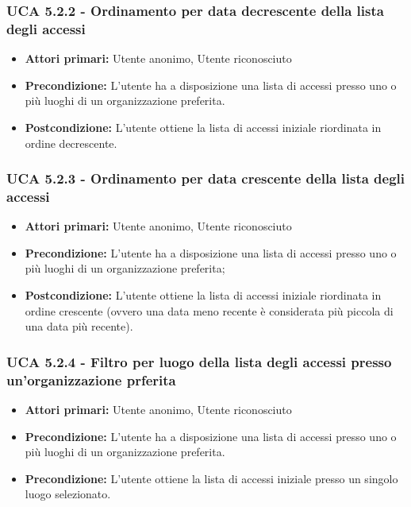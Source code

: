 \subsubsection{UCA 5.2.2 - Ordinamento per data decrescente della lista degli accessi}
\begin{itemize}
    \item \textbf{Attori primari:} Utente anonimo, Utente riconosciuto
    \item \textbf{Precondizione:} L'utente ha a disposizione una lista di accessi presso uno o più luoghi di un organizzazione preferita.
    \item \textbf{Postcondizione:} L'utente ottiene la lista di accessi iniziale riordinata in ordine decrescente.
\end{itemize}

\subsubsection{UCA 5.2.3 - Ordinamento per data crescente della lista degli accessi}
\begin{itemize}
    \item \textbf{Attori primari:} Utente anonimo, Utente riconosciuto
    \item \textbf{Precondizione:} L'utente ha a disposizione una lista di accessi presso uno o più luoghi di un organizzazione preferita;
    \item \textbf{Postcondizione:} L'utente ottiene la lista di accessi iniziale riordinata in ordine crescente (ovvero una data meno recente è considerata più piccola di una data più recente).
\end{itemize}

\subsubsection{UCA 5.2.4 - Filtro per luogo della lista degli accessi presso un'organizzazione prferita}
\begin{itemize}
    \item \textbf{Attori primari:} Utente anonimo, Utente riconosciuto
    \item \textbf{Precondizione:} L'utente ha a disposizione una lista di accessi presso uno o più luoghi di un organizzazione preferita.
    \item \textbf{Precondizione:} L'utente ottiene la lista di accessi iniziale presso un singolo luogo selezionato.
\end{itemize}